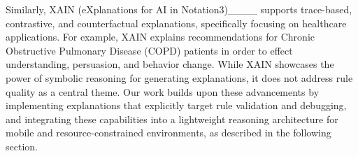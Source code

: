 Similarly, XAIN (eXplanations for AI in Notation3)____ supports trace-based, contrastive, and counterfactual explanations, specifically focusing on healthcare applications. For example, XAIN explains recommendations for Chronic Obstructive Pulmonary Disease (COPD) patients in order to effect understanding, persuasion, and behavior change. 
While XAIN showcases the power of symbolic reasoning for generating explanations, it does not address rule quality as a central theme. Our work builds upon these advancements by implementing explanations that explicitly target rule validation and debugging, %
and integrating these capabilities into a lightweight reasoning architecture for mobile and resource-constrained environments, as described in the following section.

